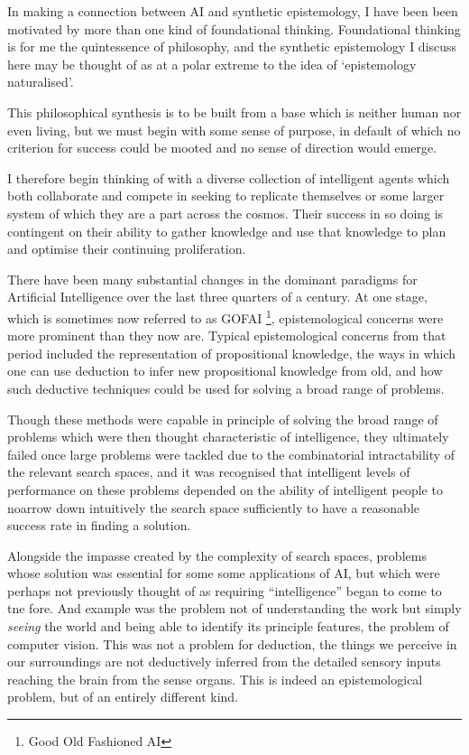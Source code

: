 \documentclass[10pt,titlepage]{book}
\begin{document}
In making a connection between AI and synthetic epistemology, I have been been motivated by more than one kind of foundational thinking.
Foundational thinking is for me the quintessence of philosophy, and the synthetic epistemology I discuss here may be thought of as at a polar extreme to the idea of `epistemology naturalised'.

This philosophical synthesis is to be built from a base which is neither human nor even living, but we must begin with some sense of purpose, in default of which no criterion for success could be mooted and no sense of direction would emerge.

I therefore begin thinking of with a diverse collection of intelligent agents which both collaborate and compete in seeking to replicate themselves or some larger system of which they are a part across the cosmos.
Their success in so doing is contingent on their ability to gather knowledge and use that knowledge to plan and optimise their continuing proliferation.



There have been many substantial changes in the dominant paradigms for Artificial Intelligence over the last three quarters of a century.
At one stage, which is sometimes now referred to as GOFAI%
\footnote{Good Old Fashioned AI}, %
epistemological concerns were more prominent than they now are.
Typical epistemological concerns from that period included the representation of propositional knowledge, the ways in which one can use deduction to infer new propositional knowledge from old, and how such deductive techniques could be used for solving a broad range of problems.

Though these methods were capable in principle of solving the broad range of problems which were then thought characteristic of intelligence, they ultimately failed once large problems were tackled due to the combinatorial intractability of the relevant search spaces, and it was recognised that intelligent levels of performance on these problems depended on the ability of intelligent people to noarrow down intuitively the search space sufficiently to have a reasonable success rate in finding a solution.

Alongside the impasse created by the complexity of search spaces, problems whose solution was essential for some some applications of AI, but which were perhaps not previously thought of as requiring ``intelligence'' began to come to tne fore.
And example was the problem not of understanding the work but simply \emph{seeing} the world and being able to identify its principle features, the problem of computer vision.
This was not a problem for deduction, the things we perceive in our surroundings are not deductively inferred from the detailed sensory inputs reaching the brain from the sense organs.
This is indeed an epistemological problem, but of an entirely different kind.
\end{document}
